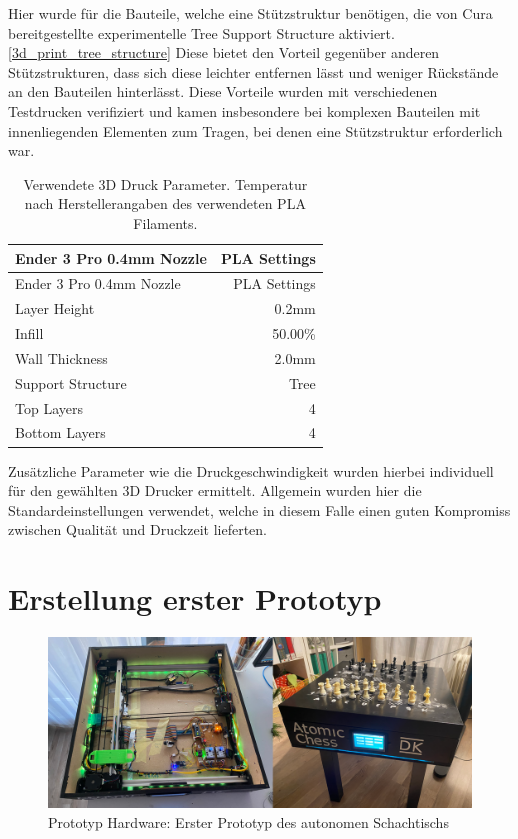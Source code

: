 Hier wurde für die Bauteile, welche eine Stützstruktur benötigen, die
von Cura bereitgestellte experimentelle Tree Support Structure
aktiviert. \ref{3d_print_tree_structure} Diese bietet den Vorteil
gegenüber anderen Stützstrukturen, dass sich diese leichter entfernen
lässt und weniger Rückstände an den Bauteilen hinterlässt. Diese
Vorteile wurden mit verschiedenen Testdrucken verifiziert und kamen
insbesondere bei komplexen Bauteilen mit innenliegenden Elementen zum
Tragen, bei denen eine Stützstruktur erforderlich war.

\begin{longtable}[]{@{}lr@{}}
\caption{Verwendete 3D Druck Parameter. Temperatur nach
Herstellerangaben des verwendeten PLA Filaments.
\label{3dprintsettings}}\tabularnewline
\toprule
Ender 3 Pro 0.4mm Nozzle & PLA Settings\tabularnewline
\midrule
\endfirsthead
\toprule
Ender 3 Pro 0.4mm Nozzle & PLA Settings\tabularnewline
\midrule
\endhead
Layer Height & 0.2mm\tabularnewline
Infill & 50.00\%\tabularnewline
Wall Thickness & 2.0mm\tabularnewline
Support Structure & Tree\tabularnewline
Top Layers & 4\tabularnewline
Bottom Layers & 4\tabularnewline
\bottomrule
\end{longtable}

Zusätzliche Parameter wie die Druckgeschwindigkeit wurden hierbei
individuell für den gewählten 3D Drucker ermittelt. Allgemein wurden
hier die Standardeinstellungen verwendet, welche in diesem Falle einen
guten Kompromiss zwischen Qualität und Druckzeit lieferten.

\hypertarget{erstellung-erster-prototyp}{%
\chapter{Erstellung erster Prototyp}\label{erstellung-erster-prototyp}}

\begin{figure}
\centering
\includegraphics{images/table_images/dk.png}
\caption{Prototyp Hardware: Erster Prototyp des autonomen Schachtischs
\label{dk}}
\end{figure}

